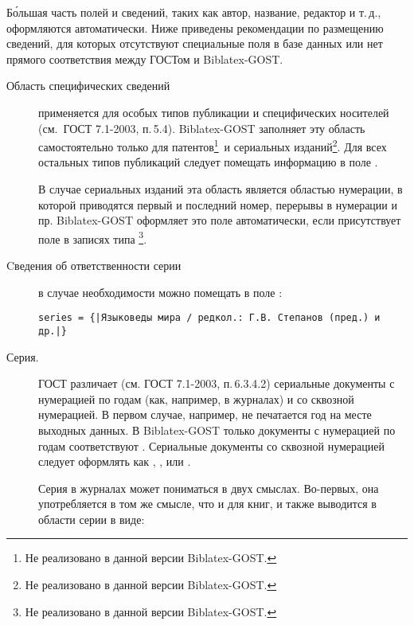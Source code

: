\documentclass[11pt,a4paper,headings=small,numbers=enddot,english,russian]{ltxdockit}[2011/03/25]
\newcommand*{\biblatex}{Biblatex\xspace}
\newcommand*{\biblatexgost}{\biblatex-GOST\xspace}
\newcommand*{\gostbibname}{ГОСТ 7.1-2003}
\newcommand*{\gostbibref}[1]{\gostbibname, п.\,#1}
\newcommand*{\notimpl}{\footnote{Не реализовано в данной версии \biblatexgost.}}
\begin{document}
Б\'{о}льшая часть полей и сведений, таких как автор, название, редактор и т.\,д., оформляются
автоматически. 
Ниже приведены рекомендации по размещению сведений, для которых отсутствуют
специальные поля в базе данных или нет прямого соответствия между ГОСТом и \biblatexgost.

\begin{description}
%
%
\item[Область специфических сведений] применяется для
особых типов публикации и специфических носителей (см.~\gostbibref{5.4}). 
\biblatexgost заполняет эту 
область самостоятельно только для патентов\notimpl\ и сериальных изданий\notimpl. 
Для всех остальных типов публикаций
следует помещать информацию в поле . 


В случае сериальных изданий эта область является областью нумерации, в которой приводятся 
первый и последний номер, перерывы в нумерации и пр. \biblatexgost оформляет это поле 
автоматически, если присутствует поле  в записях типа \notimpl.

\item[Cведения об ответственности серии] в случае необходимости можно помещать 
в поле :  
\begin{lstlisting}[style=bibtex,escapechar=|]
series = {|Языковеды мира / редкол.: Г.В. Степанов (пред.) и др.|}
\end{lstlisting}

\item[Серия.] \label{series}ГОСТ различает (см. \gostbibref{6.3.4.2}) сериальные документы 
с нумерацией по годам 
(как, например, в журналах) и со сквозной нумерацией. В первом случае, например, 
не печатается год на месте выходных данных. В \biblatexgost только документы
с нумерацией по годам соответствуют .  Сериальные документы со 
сквозной нумерацией следует оформлять как , ,
 или . 

Серия в журналах может пониматься в двух смыслах. Во-первых, она употребляется в
том же смысле, что и для книг, и также выводится в области серии в виде:


\end{description}
\end{document}
